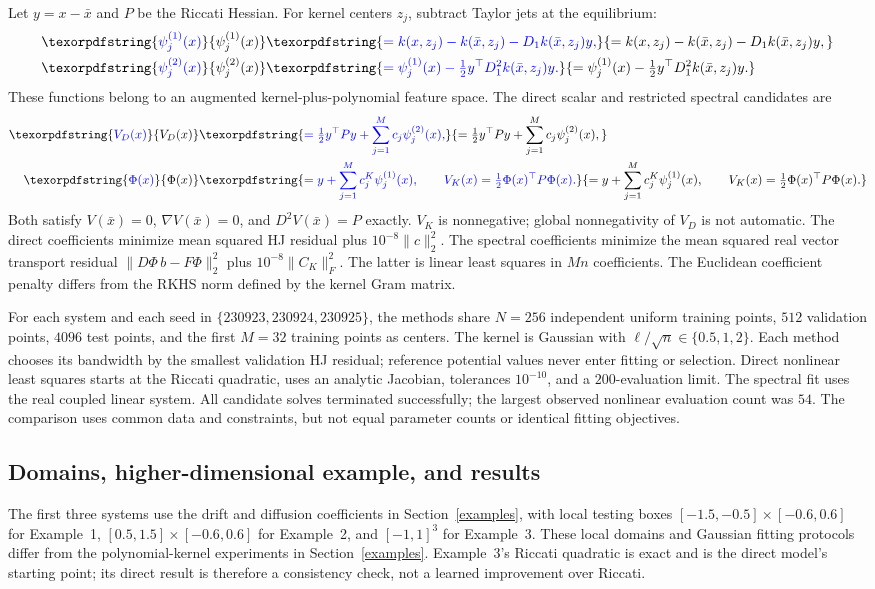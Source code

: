 \documentclass[11pt]{article}
\theoremstyle{plain}      %
\theoremstyle{definition} %
\providecommand{\DIFaddtex}[1]{{\protect\color{blue}#1}} %
\providecommand{\DIFadd}[1]{\texorpdfstring{\DIFaddtex{#1}}{#1}} %
\begin{document}
\DIFadd{Let $y=x-\bar x$ and $P$ be the Riccati Hessian. For kernel centers $z_j$, subtract Taylor jets at the equilibrium:
}\begin{align}
 \DIFadd{\psi_j^{(1)}(x)}&\DIFadd{=k(x,z_j)-k(\bar x,z_j)-D_1k(\bar x,z_j)y,}\\
 \DIFadd{\psi_j^{(2)}(x)}&\DIFadd{=\psi_j^{(1)}(x)-\tfrac12y^\top D_1^2k(\bar x,z_j)y.
}\end{align}
\DIFadd{These functions belong to an augmented kernel-plus-polynomial feature space. The direct scalar and restricted spectral candidates are
}\begin{align}\DIFadd{\label{eq:appendix-models}
 V_D(x)}&\DIFadd{=\tfrac12y^\top Py+\sum_{j=1}^M c_j\psi_j^{(2)}(x),}\\
 \DIFadd{\Phi(x)}&\DIFadd{=y+\sum_{j=1}^M c_j^K\psi_j^{(1)}(x),\qquad
 V_K(x)=\tfrac12\Phi(x)^\top P\Phi(x).
}\end{align}
\DIFadd{Both satisfy $V(\bar x)=0$, $\nabla V(\bar x)=0$, and $D^2V(\bar x)=P$ exactly. $V_K$ is nonnegative; global nonnegativity of $V_D$ is not automatic. The direct coefficients minimize mean squared HJ residual plus $10^{-8}\|c\|_2^2$. The spectral coefficients minimize the mean squared real vector transport residual $\|D\Phi\,b-F\Phi\|_2^2$ plus $10^{-8}\|C_K\|_F^2$. The latter is linear least squares in $Mn$ coefficients. The Euclidean coefficient penalty differs from the RKHS norm defined by the kernel Gram matrix.
}

\DIFadd{For each system and each seed in $\{230923,230924,230925\}$, the methods share $N=256$ independent uniform training points, $512$ validation points, $4096$ test points, and the first $M=32$ training points as centers. The kernel is Gaussian with $\ell/\sqrt n\in\{0.5,1,2\}$. Each method chooses its bandwidth by the smallest validation HJ residual; reference potential values never enter fitting or selection. Direct nonlinear least squares starts at the Riccati quadratic, uses an analytic Jacobian, tolerances $10^{-10}$, and a $200$-evaluation limit. The spectral fit uses the real coupled linear system. All candidate solves terminated successfully; the largest observed nonlinear evaluation count was $54$. The comparison uses common data and constraints, but not equal parameter counts or identical fitting objectives.
}

\subsection{\DIFadd{Domains, higher-dimensional example, and results}}\label{app:accuracy}
\DIFadd{The first three systems use the drift and diffusion coefficients in Section~\ref{examples}, with local testing boxes $[-1.5,-0.5]\times[-0.6,0.6]$ for Example~1, $[0.5,1.5]\times[-0.6,0.6]$ for Example~2, and $[-1,1]^3$ for Example~3. These local domains and Gaussian fitting protocols differ from the polynomial-kernel experiments in Section~\ref{examples}. Example~3's Riccati quadratic is exact and is the direct model's starting point; its direct result is therefore a consistency check, not a learned improvement over Riccati.
}
\end{document}

